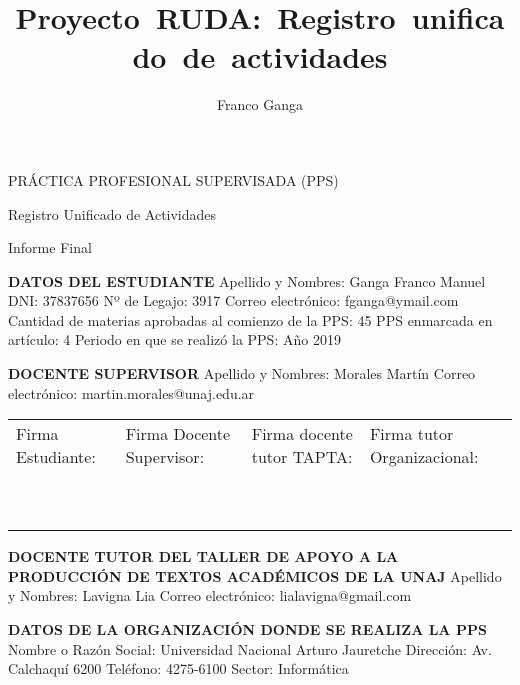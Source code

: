 \documentclass[12pt]{article}
\author{Franco Ganga}
\title{Proyecto\ RUDA:\ Registro\ unificado\ de\ actividades}
\begin{document}
\centerline{\large{PRÁCTICA PROFESIONAL SUPERVISADA (PPS)}}
\centerline{\large{Registro Unificado de Actividades}}
\centerline{\large{Informe Final}}
\begin{framed}
        \noindent\textbf{DATOS DEL ESTUDIANTE}\newline
        Apellido y Nombres: Ganga Franco Manuel\newline
        DNI: 37837656\newline
        Nº de Legajo: 3917\newline
        Correo electr\'{o}nico: fganga@ymail.com\newline
        Cantidad de materias aprobadas al comienzo de la PPS: 45\newline
        PPS enmarcada en art\'{i}culo: 4 \newline
        Periodo en que se realiz\'{o} la PPS: Año 2019
\end{framed}

\begin{framed}
        \noindent\textbf{DOCENTE SUPERVISOR}  \newline
        Apellido y Nombres: Morales Martín \newline
        Correo electr\'{o}nico: martin.morales@unaj.edu.ar
\end{framed}

\vfill
\noindent\begin{tabular}{|P{3.3cm}|P{3.3cm}|P{3.3cm}|P{3.3cm}|}
\hline
Firma Estudiante: & Firma Docente Supervisor: & Firma docente tutor TAPTA: & Firma tutor Organizacional: \\
~ & ~ & ~ & ~ \\
~ & ~ & ~ & ~ \\
\hline
\end{tabular}
\newpage

\begin{framed}
        \noindent\textbf{DOCENTE  TUTOR DEL TALLER DE APOYO A LA PRODUCCI\'{O}N DE TEXTOS ACAD\'{E}MICOS DE LA UNAJ}\newline
        Apellido y Nombres: Lavigna Lia \newline
        Correo electr\'{o}nico: lialavigna@gmail.com
\end{framed}

\begin{framed}
\noindent\textbf{DATOS DE LA ORGANIZACI\'{O}N DONDE SE REALIZA LA PPS}\newline
Nombre o Raz\'{o}n Social: Universidad Nacional Arturo Jauretche\newline
Direcci\'{o}n: Av. Calchaquí 6200\newline
Tel\'{e}fono: 4275-6100 \newline
Sector: Informática
\end{framed}
\end{document}

